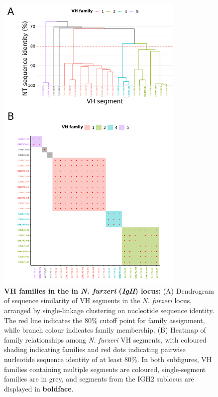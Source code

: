 	\begin{figure}
	\centering
	\begin{subfigure}{0em}
    \label{fig:nfu-vh-families-a}
    \end{subfigure}
    \begin{subfigure}{0em}
    \label{fig:nfu-vh-families-b}
    \end{subfigure}
	\includegraphics[width=0.8\textwidth]{_Figures/png/nfu-vh-families.png}
	\caption[VH families in the in \textit{N. furzeri} \textit{IgH} locus]{\textbf{VH families in the in \textit{N. furzeri} (\textit{IgH}) locus:} (A) Dendrogram of sequence similarity of VH segments in the \textit{N. furzeri} locus, arranged by single-linkage clustering on nucleotide sequence identity. The red line indicates the 80\% cutoff point for family assignment, while branch colour indicates family membership. (B) Heatmap of family relationships among \textit{N. furzeri} VH segments, with coloured shading indicating families and red dots indicating pairwise nucleotide sequence identity of at least 80\%. In both subfigures, VH families containing multiple segments are coloured, single-segment families are in grey, and segments from the IGH2 sublocus are displayed in \textbf{boldface}.}
	\label{fig:nfu-vh-families}
	\end{figure}

